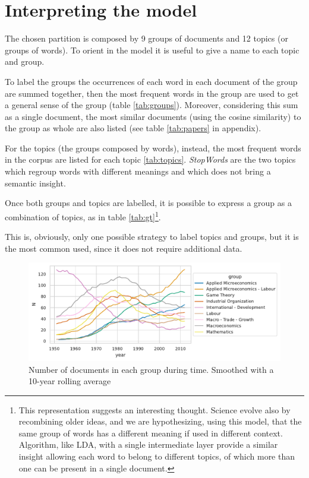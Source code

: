 \documentclass[a4paper, 11pt, headings=standardclasses, tablecaptionsbelow]{scrartcl}
\begin{document}
\section{Interpreting the model}
The chosen partition is composed by 9 groups of documents and 12 topics (or groups of words).
To orient in the model it is useful to give a name to each topic and group.



To label the groups the occurrences of each word in each document of the group are summed together, then the most frequent words in the group are used to get a general sense of the group (table \ref{tab:groups}). Moreover, considering this sum as a single document, the most similar documents (using the cosine similarity) to the group as whole are also listed (see table \ref{tab:papers} in appendix).



For the topics (the groups composed by words), instead, the most frequent words in the corpus are listed for each topic \ref{tab:topics}. \textit{StopWords} are the two topics which regroup words with different meanings and which does not bring a semantic insight.



Once both groups and topics are labelled, it is possible to express a group as a combination of topics, as in table \ref{tab:gt}\footnote{This representation suggests an interesting thought. Science evolve also by recombining older ideas, and we are hypothesizing, using this model, that the same group of words has a different meaning if used in different context. Algorithm, like LDA, with a single intermediate layer provide a similar insight allowing each word to belong to different topics, of which more than one can be present in a single document.}.

This is, obviously, only one possible strategy to label topics and groups, but it is the most common used, since it does not require additional data.

\begin{figure}[tb]
  \centering
  \includegraphics[width=\textwidth]{src/groups.pdf}
  \caption[Groups]{Number of documents in each group during time. Smoothed with a 10-year rolling average}
  \label{fig:groups}
\end{figure}
\end{document}

